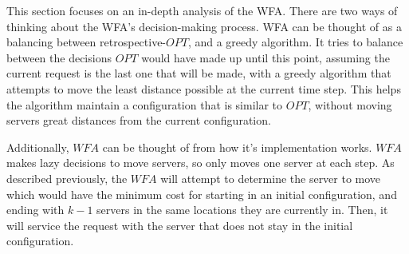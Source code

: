 This section focuses on an in-depth analysis of the WFA. There are two ways of thinking about the WFA's decision-making process. WFA can be thought of as a balancing between retrospective-$OPT$, and a greedy algorithm. It tries to balance between the decisions $OPT$ would have made up until this point, assuming the current request is the last one that will be made, with a greedy algorithm that attempts to move the least distance possible at the current time step. This helps the algorithm maintain a configuration that is similar to $OPT$, without moving servers great distances from the current configuration.

Additionally, $WFA$ can be thought of from how it's implementation works. $WFA$ makes lazy decisions to move servers, so only moves one server at each step. As described previously, the $WFA$ will attempt to determine the server to move which would have the minimum cost for starting in an initial configuration, and ending with $k-1$ servers in the same locations they are currently in. Then, it will service the request with the server that does not stay in the initial configuration.